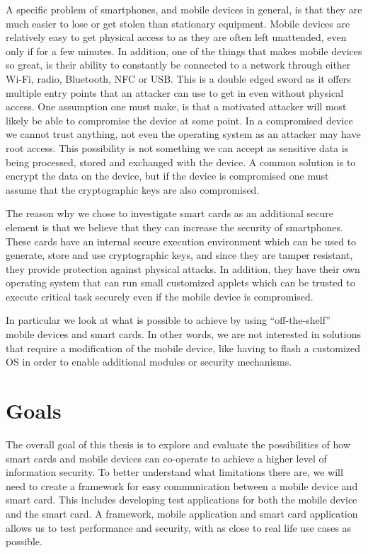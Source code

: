 A specific problem of smartphones, and mobile devices in general, is that they are much easier to lose or get stolen than stationary equipment. Mobile devices are relatively easy to get physical access to as they are often left unattended, even only if for a few minutes. In addition, one of the things that makes mobile devices so great, is their ability to constantly be connected to a network through either Wi-Fi, radio, Bluetooth, NFC or USB. This is a double edged sword as it offers multiple entry points that an attacker can use to get in even without physical access. One assumption one must make, is that a motivated attacker will most likely be able to compromise the device at some point. In a compromised device we cannot trust anything, not even the operating system as an attacker may have root access. This possibility is not something we can accept as sensitive data is being processed, stored and exchanged with the device. A common solution is to encrypt the data on the device, but if the device is compromised one must assume that the cryptographic keys are also compromised.

The reason why we chose to investigate smart cards as an additional secure element is that we believe that they can increase the security of smartphones. These cards have an internal secure execution environment which can be used to generate, store and use cryptographic keys, and since they are tamper resistant, they provide protection against physical attacks. In addition, they have their own operating system that can run small customized applets which can be trusted to execute critical task securely even if the mobile device is compromised.

In particular we look at what is possible to achieve by using ``off-the-shelf'' mobile devices and smart cards. In other words, we are not interested in solutions that require a modification of the mobile device, like having to flash a customized OS in order to enable additional modules or security mechanisms.


\section{Goals}
\label{sec:goals}
The overall goal of this thesis is to explore and evaluate the possibilities of how smart cards and mobile devices can co-operate to achieve a higher level of information security. To better understand what limitations there are, we will need to create a framework for easy communication between a mobile device and smart card. This includes developing test applications for both the mobile device and the smart card. A framework, mobile application and smart card application allows us to test performance and security, with as close to real life use cases as possible.

